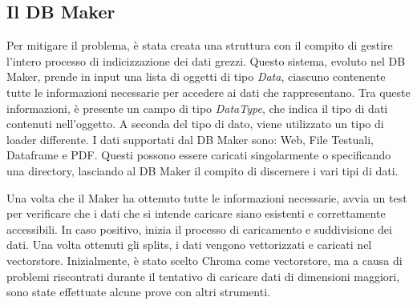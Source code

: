 \subsection{Il DB Maker}
\label{sec:dbmaker}
Per mitigare il problema, è stata creata una struttura con il compito di gestire l'intero processo di indicizzazione dei dati grezzi. Questo sistema, evoluto nel DB Maker, prende in input una lista di oggetti di tipo \textit{Data}, ciascuno contenente tutte le informazioni necessarie per accedere ai dati che rappresentano. Tra queste informazioni, è presente un campo di tipo \textit{DataType}, che indica il tipo di dati contenuti nell'oggetto. A seconda del tipo di dato, viene utilizzato un tipo di loader differente. I dati supportati dal DB Maker sono: Web, File Testuali, Dataframe e PDF. Questi possono essere caricati singolarmente o specificando una directory, lasciando al DB Maker il compito di discernere i vari tipi di dati.

Una volta che il Maker ha ottenuto tutte le informazioni necessarie, avvia un test per verificare che i dati che si intende caricare siano esistenti e correttamente accessibili. In caso positivo, inizia il processo di caricamento e suddivisione dei dati. Una volta ottenuti gli splits, i dati vengono vettorizzati e caricati nel vectorstore. Inizialmente, è stato scelto Chroma come vectorstore, ma a causa di problemi riscontrati durante il tentativo di caricare dati di dimensioni maggiori, sono state effettuate alcune prove con altri strumenti.

